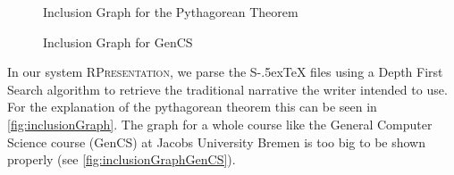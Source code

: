 \documentclass[twoside, 12pt]{article}
\def\stex{\texorpdfstring{\raisebox{-.5ex}S\kern-.5ex\TeX}{sTeX}\xspace}
\newcommand{\sys}{\textsc{RPresentation}\xspace}
\begin{document}
\begin{figure}
\vspace{-26pt}
  \begin{center}
\vspace{-20pt}
  \caption{Inclusion Graph for the Pythagorean Theorem}
  \label{fig:inclusionGraph}
\vspace{12pt}
  \end{center}
\end{figure}

\begin{figure}
\vspace{-60pt}
\end{figure}

\begin{figure}
\vspace{-28pt}
  \begin{center}
\vspace{-20pt}
  \caption{Inclusion Graph for GenCS}
  \label{fig:inclusionGraphGenCS}
\vspace{-24pt}
  \end{center}
\end{figure}

In our system \sys, we parse the \stex files using a Depth First Search algorithm to retrieve the traditional narrative the writer intended to use. For the explanation of the pythagorean theorem this can be seen in \autoref{fig:inclusionGraph}. The graph for a whole course like the General Computer Science course (GenCS) at Jacobs University Bremen \cite{Kohlhase:GenCSII:base} is too big to be shown properly (see \autoref{fig:inclusionGraphGenCS}).\\
\end{document}

